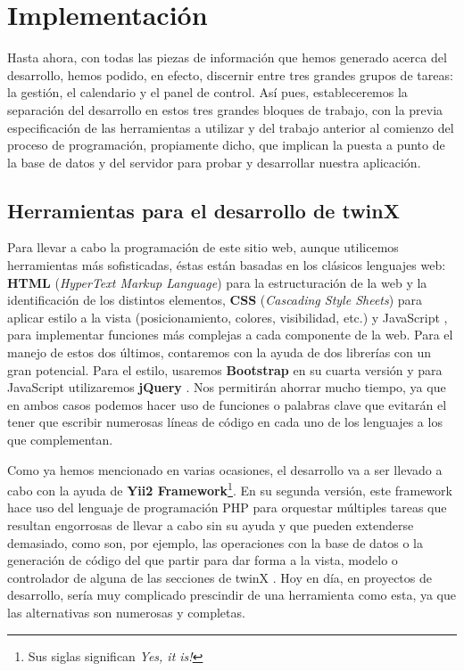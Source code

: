 \chapter{Implementación}
\label{implementacion}

Hasta ahora, con todas las piezas de información que hemos generado acerca del desarrollo, hemos podido, en efecto, discernir entre tres grandes grupos de tareas: la gestión, el calendario y el panel de control. Así pues, estableceremos la separación del desarrollo en estos tres grandes bloques de trabajo, con la previa especificación de las herramientas a utilizar y del trabajo anterior al comienzo del proceso de programación, propiamente dicho, que implican la puesta a punto de la base de datos y del servidor para probar y desarrollar nuestra aplicación.

\section{Herramientas para el desarrollo de twinX}
\label{sec:herramientasdesarrollo}

Para llevar a cabo la programación de este sitio web, aunque utilicemos herramientas más sofisticadas, éstas están basadas en los clásicos lenguajes web: \textbf{HTML} (\textit{HyperText Markup Language}) \cite{html} para la estructuración de la web y la identificación de los distintos elementos, \textbf{CSS} \cite{css} (\textit{Cascading Style Sheets}) para aplicar estilo a la vista (posicionamiento, colores, visibilidad, etc.) y JavaScript \cite{javascript}, para implementar funciones más complejas a cada componente de la web. Para el manejo de estos dos últimos, contaremos con la ayuda de dos librerías con un gran potencial. Para el estilo, usaremos \textbf{Bootstrap} \cite{bootstrap} en su cuarta versión y para JavaScript utilizaremos \textbf{jQuery} \cite{jquery}. Nos permitirán ahorrar mucho tiempo, ya que en ambos casos podemos hacer uso de funciones o palabras clave que evitarán el tener que escribir numerosas líneas de código en cada uno de los lenguajes a los que complementan.

Como ya hemos mencionado en varias ocasiones, el desarrollo va a ser llevado a cabo con la ayuda de \textbf{Yii2 Framework}\footnote{Sus siglas significan \textit{Yes, it is!}}. En su segunda versión, este framework hace uso del lenguaje de programación PHP para orquestar múltiples tareas que resultan engorrosas de llevar a cabo sin su ayuda y que pueden extenderse demasiado, como son, por ejemplo, las operaciones con la base de datos o la generación de código del que partir para dar forma a la vista, modelo o controlador de alguna de las secciones de twinX \cite{yii}. Hoy en día, en proyectos de desarrollo, sería muy complicado prescindir de una herramienta como esta, ya que las alternativas son numerosas y completas.

